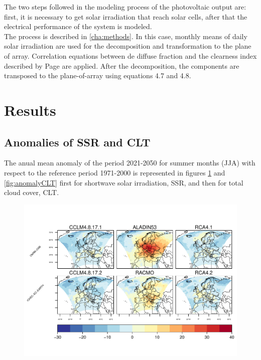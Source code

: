 The two steps followed in the modeling process of the photovoltaic output are: first, it is necessary to get solar irradiation that reach solar cells, after that the electrical performance of the system is modeled.\\

The process is described in \ref{cha:methods}. In this case, monthly means of daily solar irradiation are used for the decomposition and transformation to the plane of array. Correlation equations between de diffuse fraction and the clearness index described by Page are applied. After the decomposition, the components are transposed to the plane-of-array using equations 4.7 and 4.8.\\   

\section{Results}

\subsection{Anomalies of SSR and CLT}

The anual mean anomaly of the period 2021-2050 for summer months (JJA) with respect to the reference period 1971-2000 is represented in figures \ref{fig:anomalySSR} and \ref{fig:anomalyCLT} first for shortwave solar irradiation, SSR, and then for total cloud cover, CLT.\\

\begin{figure}[h!]
\centering\includegraphics[width=1\textwidth]{figs/capitulo7/ANOMALIAS_JJA_SSR_2050-2021_r12.pdf}
\caption{}
\label{fig:anomalySSR}
\end{figure}

